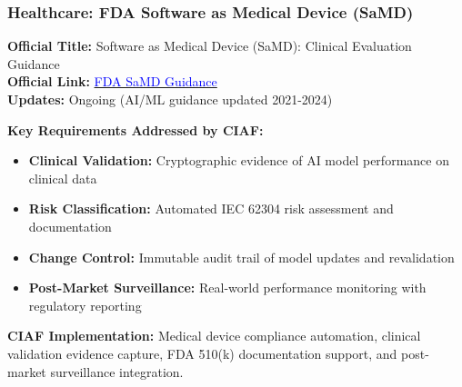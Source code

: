 \documentclass[12pt,a4paper]{article}
\begin{document}
\subsubsection{Healthcare: FDA Software as Medical Device (SaMD)}
\begin{valuebox}
\textbf{Official Title:} Software as Medical Device (SaMD): Clinical Evaluation Guidance\\
\textbf{Official Link:} \href{https://www.fda.gov/medical-devices/digital-health-center-excellence/software-medical-device-samd}{\textcolor{blue}{FDA SaMD Guidance}}\\
\textbf{Updates:} Ongoing (AI/ML guidance updated 2021-2024)

\textbf{Key Requirements Addressed by CIAF:}
\begin{itemize}
\item \textbf{Clinical Validation:} Cryptographic evidence of AI model performance on clinical data
\item \textbf{Risk Classification:} Automated IEC 62304 risk assessment and documentation
\item \textbf{Change Control:} Immutable audit trail of model updates and revalidation
\item \textbf{Post-Market Surveillance:} Real-world performance monitoring with regulatory reporting
\end{itemize}

\textbf{CIAF Implementation:} Medical device compliance automation, clinical validation evidence capture, FDA 510(k) documentation support, and post-market surveillance integration.
\end{valuebox}
\end{document}
